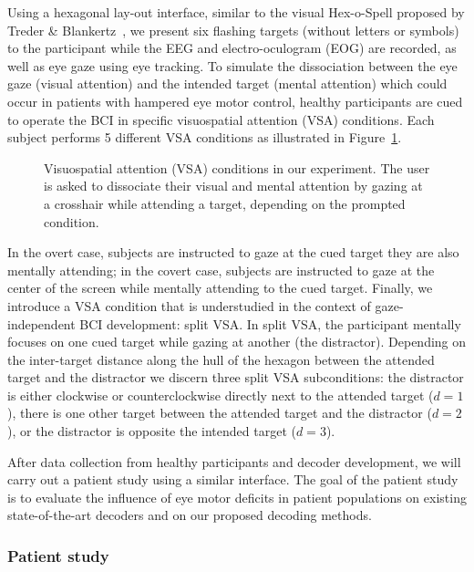 Using a hexagonal lay-out interface, similar to the visual Hex-o-Spell proposed
by Treder \& Blankertz~\cite{Treder2010}, we present six flashing targets (without letters or
symbols) to the participant while the EEG and electro-oculogram (EOG) are
recorded, as well as eye gaze using eye tracking.
To simulate the dissociation between the eye gaze (visual attention) and the
intended target (mental attention) which could occur in patients with hampered eye
motor control, healthy participants are cued to operate the BCI in specific
visuospatial attention (VSA) conditions.
Each subject performs 5 different VSA conditions as illustrated in
Figure~\ref{fig:vsa-conditions}.
\begin{figure}
	\caption{Visuospatial attention (VSA) conditions in our experiment. The user is
		asked to dissociate their visual and mental attention by gazing at a
		crosshair while attending a target, depending on the prompted condition.}%
	\label{fig:vsa-conditions}
\end{figure}
In the overt case, subjects are instructed to gaze at the cued
target they are also mentally attending; in the covert case, subjects are instructed
to gaze at the center of the screen while mentally attending to the cued target.
Finally, we introduce a VSA condition that is understudied in the context of
gaze-independent BCI development: split VSA.
In split VSA, the participant mentally focuses on one cued target while gazing at
another (the distractor).
Depending on the inter-target distance along the hull of the hexagon between the
attended target and the distractor we discern three split VSA subconditions:
the distractor is either clockwise or counterclockwise directly next to the
attended target ($d=1$), there is one other target between the attended target and
the distractor ($d=2$), or the distractor is opposite the intended target
($d=3$).


After data collection from healthy participants and decoder development, we
will carry out a patient study using a similar interface.
The goal of the patient study is to evaluate the influence of eye motor
deficits in patient populations on existing state-of-the-art decoders and on
our proposed decoding methods.

\subsubsection{Patient study}
\todo{}
